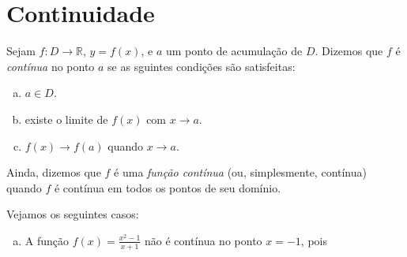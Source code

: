 
\chapter{Continuidade}\label{cap:continuidade}
\thispagestyle{fancy}

\begin{defn}
  Sejam $f:D\to\mathbb{R}$, $y=f(x)$, e $a$ um ponto de acumulação de $D$. Dizemos que $f$ é \emph{contínua} no ponto $a$ se as sguintes condições são satisfeitas:
  \begin{enumerate}[a)]
  \item $a\in D$.
  \item existe o limite de $f(x)$ com $x\to a$.
  \item $f(x)\to f(a)$ quando $x\to a$.
  \end{enumerate}
Ainda, dizemos que $f$ é uma \emph{função contínua} (ou, simplesmente, contínua) quando $f$ é contínua em todos os pontos de seu domínio.
\end{defn}

\begin{ex}
  Vejamos os seguintes casos:
  \begin{enumerate}[a)]
  \item A função $\displaystyle f(x)=\frac{x^2-1}{x+1}$ não é contínua no ponto $x=-1$, pois 
  \end{enumerate}
\end{ex}
